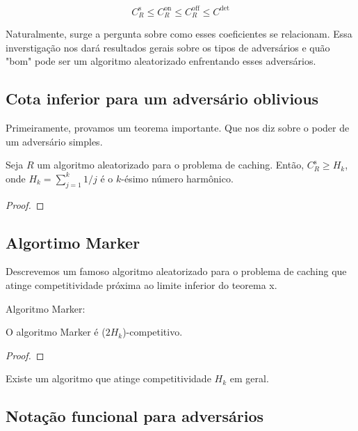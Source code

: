 \begin{equation}
  C_R^{\text{s}} \leqslant C_R^{\text{on}} \leqslant C_R^{\text{off}} \leqslant C^{\text{det}}
\end{equation}

Naturalmente, surge a pergunta sobre como esses coeficientes se relacionam. Essa inverstigação nos dará resultados gerais sobre os tipos de adversários e quão "bom" pode ser um algoritmo aleatorizado enfrentando esses adversários.


\subsection{Cota inferior para um adversário oblivious}

Primeiramente, provamos um teorema importante. Que nos diz sobre o poder de um adversário simples.

\begin{theorem}
  Seja \(R\) um algoritmo aleatorizado para o problema de caching. Então, \(C_R^{\text{s}} \geqslant H_k\), onde \(H_k = \sum_{j = 1}^{k} 1/j\) é o \(k\)-ésimo número harmônico.
  \begin{proof}
  \end{proof}
\end{theorem}


\subsection{Algortimo Marker}

Descrevemos um famoso algoritmo aleatorizado para o problema de caching que atinge competitividade próxima ao limite inferior do teorema x.

Algoritmo Marker: 

\begin{theorem}

  O algoritmo Marker é (\(2H_k\))-competitivo.
  
  \begin{proof}
    
  \end{proof}
  
\end{theorem}


Existe um algoritmo que atinge competitividade \(H_k\) em geral.

\subsection{Notação funcional para adversários}

